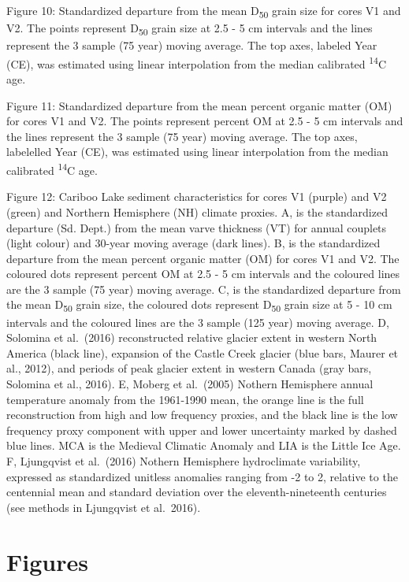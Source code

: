 \documentclass[
  letterpaper,
  DIV=11,
  numbers=noendperiod]{scrartcl}
\begin{document}
Figure 10: Standardized departure from the mean D\textsubscript{50}
grain size for cores V1 and V2. The points represent D\textsubscript{50}
grain size at 2.5 - 5 cm intervals and the lines represent the 3 sample
(75 year) moving average. The top axes, labeled Year (CE), was estimated
using linear interpolation from the median calibrated
\textsuperscript{14}C age.

Figure 11: Standardized departure from the mean percent organic matter
(OM) for cores V1 and V2. The points represent percent OM at 2.5 - 5 cm
intervals and the lines represent the 3 sample (75 year) moving average.
The top axes, labelelled Year (CE), was estimated using linear
interpolation from the median calibrated \textsuperscript{14}C age.

Figure 12: Cariboo Lake sediment characteristics for cores V1 (purple)
and V2 (green) and Northern Hemisphere (NH) climate proxies. A, is the
standardized departure (Sd. Dept.) from the mean varve thickness (VT)
for annual couplets (light colour) and 30-year moving average (dark
lines). B, is the standardized departure from the mean percent organic
matter (OM) for cores V1 and V2. The coloured dots represent percent OM
at 2.5 - 5 cm intervals and the coloured lines are the 3 sample (75
year) moving average. C, is the standardized departure from the mean
D\textsubscript{50} grain size, the coloured dots represent
D\textsubscript{50} grain size at 5 - 10 cm intervals and the coloured
lines are the 3 sample (125 year) moving average. D, Solomina et
al.~(2016) reconstructed relative glacier extent in western North
America (black line), expansion of the Castle Creek glacier (blue bars,
Maurer et al., 2012), and periods of peak glacier extent in western
Canada (gray bars, Solomina et al., 2016). E, Moberg et al.~(2005)
Nothern Hemisphere annual temperature anomaly from the 1961-1990 mean,
the orange line is the full reconstruction from high and low frequency
proxies, and the black line is the low frequency proxy component with
upper and lower uncertainty marked by dashed blue lines. MCA is the
Medieval Climatic Anomaly and LIA is the Little Ice Age. F, Ljungqvist
et al.~(2016) Nothern Hemisphere hydroclimate variability, expressed as
standardized unitless anomalies ranging from -2 to 2, relative to the
centennial mean and standard deviation over the eleventh-nineteenth
centuries (see methods in Ljungqvist et al.~2016).\pagebreak

\hypertarget{figures}{%
\section{Figures}\label{figures}}
\end{document}
